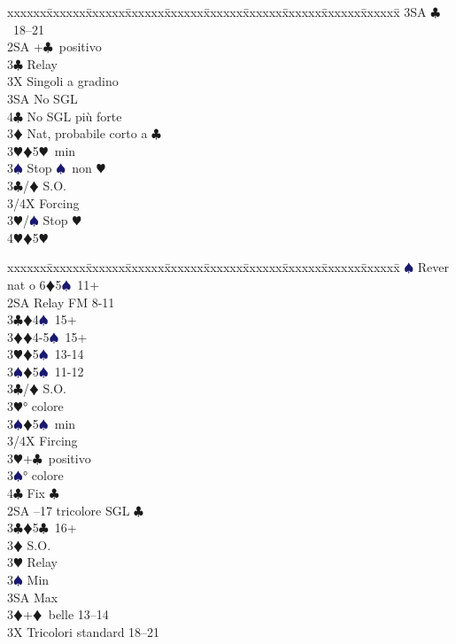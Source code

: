 \documentclass[a4paper,italian]{article}
\newcommand{\BC}{\textcolor{OliveGreen}{$\clubsuit$}}
\newcommand{\BD}{\textcolor{RedOrange}{$\vardiamondsuit$}}
\newcommand{\BH}{\textcolor{Red2}{$\varheartsuit${}}}
\newcommand{\BS}{\textcolor{MidnightBlue}{$\spadesuit${}}}
\newenvironment{bidtable}
{\begin{tabbing}

    xxxxxx\=xxxxxx\=xxxxxx\=xxxxxx\=xxxxxx\=xxxxxx\=xxxxxx\=xxxxxx\=xxxxxx\=xxxxxx\=\kill}
{\end{tabbing} }%
\begin{document}
\begin{multicols}{2}
\begin{bidtable}
        3SA \BC\ 18--21\-\\
        2SA +\BC\ positivo\+\\
        3\BC \> Relay\+\\
        3X \> Singoli a gradino\\
        3SA \> No SGL\\
        4\BC \> No SGL più forte\-\\
        3\BD \> Nat, probabile corto a \BC \\
        3\BH {}\BD 5\BH\ min\\
        3\BS \> Stop \BS\ non \BH \-\\
        3\BC/\BD \> S.O.\+\\
        3/4X \> Forcing\\
        3\BH/\BS \> Stop \BH \\
        4\BH {}\BD 5\BH \-\-\\
    \end{bidtable}
    \columnbreak
    \begin{bidtable}
        \BS \> Rever nat o 6\BD 5\BS\ 11+\+\+\\
        2SA \> Relay FM 8-11\+\\
        3\BC {}\BD 4\BS\ 15+\\
        3\BD {}\BD 4-5\BS\ 15+\\
        3\BH {}\BD 5\BS\ 13-14\\
        3\BS {}\BD 5\BS\ 11-12\-\\
        3\BC/\BD \> S.O.\+\\
        3\BH {}° colore\\
        3\BS {}\BD 5\BS\ min\\
        3/4X \> Fircing\-\\
        3\BH {}+\BC\ positivo\+\\
        3\BS {}° colore\\
        4\BC \> Fix \BC \-\-\\
        2SA --17 tricolore SGL \BC \\
        3\BC {}\BD 5\BC\ 16+\+\\
        3\BD \> S.O.\\
        3\BH \> Relay\+\\
        3\BS \> Min\\
        3SA \> Max\-\-\\
        3\BD {}+\BD\ belle 13--14\\
        3X \> Tricolori standard 18--21
    \end{bidtable}

\end{multicols}
\end{document}
